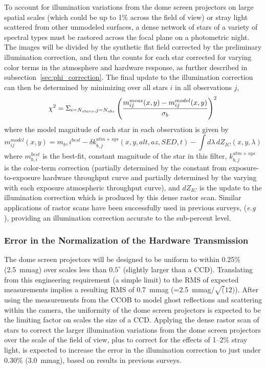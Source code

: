 \documentclass[12pt,preprint]{aastex}
\begin{document}
To account for illumination variations from the dome screen projectors
on large spatial scales (which could be up to 1\% across the field of
view) or stray light scattered from other unmodeled surfaces, a dense
network of stars of a variety of spectral types must be rastored
across the focal plane on a photometric night. The images will be
divided by the synthetic flat field corrected by the preliminary
illumination correction, and then the counts for each star corrected
for varying color terms in the atmosphere and hardware response, as
further described in subsection~\ref{sec:phi_correction}.  The final
update to the illumination correction can then be determined by
minimizing over all stars $i$ in all observations $j$,
\begin{equation}
 \chi^2 =  \Sigma_{i=N_{stars},j=N_{obs}} \left( { m_{ij}^{meas}(x,y) - m_{ij}^{model}(x,y)
\over \sigma_b} \right)^2  
\end{equation}
where the model magnitude of each star in each observation is given by
\begin{equation}
m_{ij}^{model}(x,y) =  m_b,i^{best} - \delta k_{b,j}^{atm+sys}(x,y,alt,az,SED,t) - \int d\lambda \, dZ_{IC}(x,y,\lambda)
\end{equation}
where $m_{b,i}^{best}$ is the best-fit, constant magnitude of the star
in this filter, $k_{b,j}^{atm+sys}$ is the color-term correction
(partially determined by the constant from exposure-to-exposure
hardware throughput curve and partially determined by the varying with
each exposure atmospheric throughput curve), and $dZ_{IC}$ is the
update to the illumination correction which is produced by this dense
rastor scan. Similar applications of rastor scans have been
successfully used in previous surveys, ({\it e.g} \citet{Regnault2009,
Magnier2004, Manfroid1996}), providing an illumination correction
accurate to the sub-percent level.

\subsubsection{Error in the Normalization of the Hardware Transmission}

The dome screen projectors will be designed to be uniform to within
0.25\% (2.5~mmag) over scales less than $0.5^{\circ}$ (slightly larger
than a CCD). Translating from this engineering requirement (a simple
limit) to the RMS of expected measurements implies a resulting RMS of
0.7~mmag (=2.5~mmag/$\sqrt(12)$). After using the measurements from
the CCOB to model ghost reflections and scattering within the camera,
the uniformity of the dome screen projectors is expected to be the
limiting factor on scales the size of a CCD. Applying the dense rastor
scan of stars to correct the larger illumination variations from the
dome screen projectors over the scale of the field of view, plus to
correct for the effects of 1--2\% stray light, is expected to increase
the error in the illumination correction to just under 0.30\%
(3.0~mmag), based on results in previous surveys.
\end{document}

